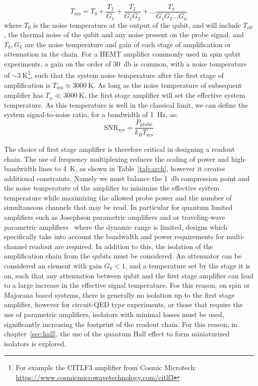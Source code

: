 \begin{equation}
  T_\textrm{sys} = T_{0} + \frac{T_{1}}{G_1} + \frac{T_{2}}{G_1G_2} + \ldots \frac{T_{n}}{G_1G_2 \ldots G_{n}}
\end{equation}
where $T_{0}$ is the noise temperature at the output of the qubit, and will include $T_\textrm{eff}$, the thermal noise of the qubit and any noise present on the
probe signal, and $T_k,G_k$ are the noise temperature and gain of each stage of amplification or attenuation in the chain. For a HEMT amplifier commonly used in
spin qubit experiments, a gain on the order of \SI{30}{\decibel} is common, with a noise temperature of $\sim \SI{3}{\kelvin}$\footnote{For example the CITLF3 amplifier
from Cosmic Microtech: \url{https://www.cosmicmicrowavetechnology.com/citlf3}}, such that the system noise temperature after the first stage of amplification
is $T_\textrm{sys} \approx \SI{3000}{\kelvin}$. As long as the noise temperature of subsequent amplifier has $T_n \ll \SI{3000}{\kelvin}$, the first stage amplifier
will set the effective system temperature. As this temperature is well in the classical limit, we can define the system signal-to-noise ratio,
for a bandwidth of \SI{1}{\hertz}, as:
\begin{equation}
  \textrm{SNR}_\textrm{sys} = \frac{P_\textrm{probe}}{k_B T_\textrm{sys}}
  \label{eq:r_snr}
\end{equation}

The choice of first stage amplifier is therefore critical in designing a readout chain. The use of frequency multiplexing reduces the scaling of power and high-bandwidth
lines to \SI{4}{\kelvin}, as shown in Table~\ref{tab:arch}, however it creates additional constraints. Namely we must balance the \SI{1}{\decibel} compression point and
the noise temperature of the amplifier to minimize the effective system temperature while maximizing the allowed probe power and the number of simultaneous channels that
may be read. In particular for quantum limited amplifiers such as Josephson parametric amplifiers and or traveling-wave parametric amplifiers~\cite{Macklin307}
where the dynamic range is limited, designs which specifically take into account the bandwidth and power requirements for multi-channel readout are required. In addition
to this, the isolation of the amplification chain from the qubits must be considered. An attenuator can be considered an element with gain $G_k < 1$, and a temperature
set by the stage it is on, such that any attenuation between qubit and the first stage amplifier can lead to a large increase in the effective signal temperature. For this
reason, on spin or Majorana based systems, there is generally no isolation up to the first stage amplifier, however for circuit-QED type experiments, or those that require
the use of parametric amplifiers, isolators with minimal losses must be used, significantly increasing the footprint of the readout chain. For this reason, in
chapter~\ref{sec:hall}, the use of the quantum Hall effect to form miniaturized isolators is explored.

